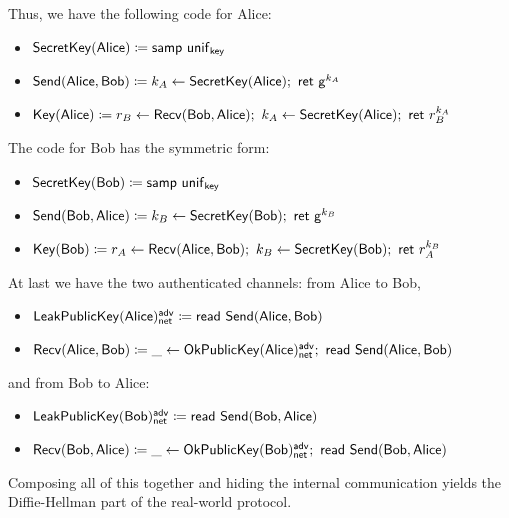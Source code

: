 Thus, we have the following code for Alice:
\begin{itemize}
\item $\mathsf{SecretKey}(\mathsf{Alice}) \coloneqq \mathsf{samp} \ \mathsf{unif}_{\mathsf{key}}$
\item $\mathsf{Send}(\mathsf{Alice},\mathsf{Bob}) \coloneqq k_A \leftarrow \mathsf{SecretKey}(\mathsf{Alice}); \ \mathsf{ret} \ \mathsf{g}^{k_A}$
\item $\Key(\Alice) \coloneqq r_B \leftarrow \Recv(\Bob,\Alice); \ k_A \leftarrow \SecretKey(\Alice); \ \ret{r_B^{k_A}}$
\end{itemize}
The code for Bob has the symmetric form:
\begin{itemize}
\item $\mathsf{SecretKey}(\mathsf{Bob}) \coloneqq \mathsf{samp} \ \mathsf{unif}_{\mathsf{key}}$
\item $\mathsf{Send}(\mathsf{Bob},\mathsf{Alice}) \coloneqq k_B \leftarrow \mathsf{SecretKey}(\mathsf{Bob}); \ \mathsf{ret} \ \mathsf{g}^{k_B}$
\item $\Key(\Bob) \coloneqq r_A \leftarrow \Recv(\Alice,\Bob); \ k_B \leftarrow \SecretKey(\Bob); \ \ret{r_A^{k_B}}$
\end{itemize}
At last we have the two authenticated channels: from Alice to Bob,
\begin{itemize}
\item $\mathsf{LeakPublicKey}(\mathsf{Alice})^{\mathsf{adv}}_{\mathsf{net}} \coloneqq \mathsf{read} \ \mathsf{Send}(\mathsf{Alice},\mathsf{Bob})$
\item $\Recv(\Alice,\Bob) \coloneqq \_ \leftarrow \OkPublicKey(\Alice)^\adv_\net; \ \read{\Send(\Alice,\Bob)}$
\end{itemize}
and from Bob to Alice:
\begin{itemize}
\item $\mathsf{LeakPublicKey}(\mathsf{Bob})^{\mathsf{adv}}_{\mathsf{net}} \coloneqq \mathsf{read} \ \mathsf{Send}(\mathsf{Bob},\mathsf{Alice})$
\item $\Recv(\Bob,\Alice) \coloneqq \_ \leftarrow \OkPublicKey(\Bob)^\adv_\net; \ \read{\Send(\Bob,\Alice)}$
\end{itemize}
Composing all of this together and hiding the internal communication yields the Diffie-Hellman part of the real-world protocol.

